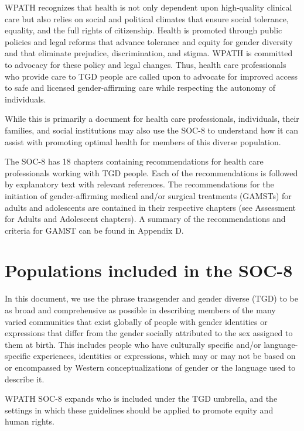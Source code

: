 \documentclass[
]{book}
\begin{document}
WPATH recognizes that health is not only
dependent upon high-quality clinical care but
also relies on social and political climates that
ensure social tolerance, equality, and the full
rights of citizenship. Health is promoted through
public policies and legal reforms that advance
tolerance and equity for gender diversity and that
eliminate prejudice, discrimination, and stigma.
WPATH is committed to advocacy for these policy and legal changes. Thus, health care professionals who provide care to TGD people are
called upon to advocate for improved access to
safe and licensed gender-affirming care while
respecting the autonomy of individuals.

While this is primarily a document for health
care professionals, individuals, their families, and
social institutions may also use the SOC-8 to understand how it can assist with promoting optimal
health for members of this diverse population.

The SOC-8 has 18 chapters containing recommendations for health care professionals working
with TGD people. Each of the recommendations
is followed by explanatory text with relevant references. The recommendations for the initiation
of gender-affirming medical and/or surgical treatments (GAMSTs) for adults and adolescents are
contained in their respective chapters (see
Assessment for Adults and Adolescent chapters).
A summary of the recommendations and criteria
for GAMST can be found in Appendix D.

\hypertarget{populations-included-in-the-soc-8}{%
\section*{Populations included in the SOC-8}\label{populations-included-in-the-soc-8}}

In this document, we use the phrase transgender
and gender diverse (TGD) to be as broad and
comprehensive as possible in describing members
of the many varied communities that exist globally of people with gender identities or expressions that differ from the gender socially
attributed to the sex assigned to them at birth.
This includes people who have culturally specific
and/or language-specific experiences, identities or
expressions, which may or may not be based on
or encompassed by Western conceptualizations
of gender or the language used to describe it.

WPATH SOC-8 expands who is included under
the TGD umbrella, and the settings in which
these guidelines should be applied to promote
equity and human rights.
\end{document}
